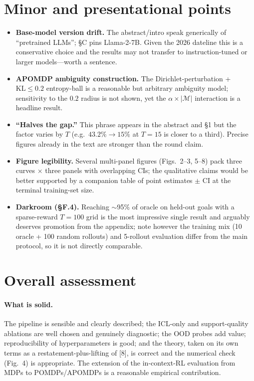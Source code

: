 \documentclass[11pt]{article}
\begin{document}
\section{Minor and presentational points}

\begin{itemize}[leftmargin=1.4em,itemsep=3pt,topsep=2pt]
  \item \textbf{Base-model version drift.} The abstract/intro speak generically of ``pretrained
  LLMs''; \S C pins Llama-2-7B. Given the 2026 dateline this is a conservative choice and the
  results may not transfer to instruction-tuned or larger models---worth a sentence.
  \item \textbf{APOMDP ambiguity construction.} The Dirichlet-perturbation + $\mathrm{KL}\le0.2$
  entropy-ball is a reasonable but arbitrary ambiguity model; sensitivity to the $0.2$ radius is
  not shown, yet the $\alpha\times|\mathcal{M}|$ interaction is a headline result.
  \item \textbf{``Halves the gap.''} This phrase appears in the abstract and \S1 but the factor
  varies by $T$ (e.g.\ $43.2\%\to15\%$ at $T=15$ is closer to a third). Precise figures already
  in the text are stronger than the round claim.
  \item \textbf{Figure legibility.} Several multi-panel figures (Figs.\ 2--3, 5--8) pack three
  curves $\times$ three panels with overlapping CIs; the qualitative claims would be better
  supported by a companion table of point estimates $\pm$ CI at the terminal training-set size.
  \item \textbf{Darkroom (\S F.4).} Reaching $\sim$95\% of oracle on held-out goals with a
  sparse-reward $T=100$ grid is the most impressive single result and arguably deserves
  promotion from the appendix; note however the training mix (10 oracle + 100 random rollouts)
  and 5-rollout evaluation differ from the main protocol, so it is not directly comparable.
\end{itemize}

\section{Overall assessment}

\paragraph{What is solid.} The pipeline is sensible and clearly described; the ICL-only and
support-quality ablations are well chosen and genuinely diagnostic; the OOD probes add value;
reproducibility of hyperparameters is good; and the theory, taken on its own terms as a
restatement-plus-lifting of [8], is correct and the numerical check (Fig.\ 4) is appropriate.
The extension of the in-context-RL evaluation from MDPs to POMDPs/APOMDPs is a reasonable
empirical contribution.
\end{document}
